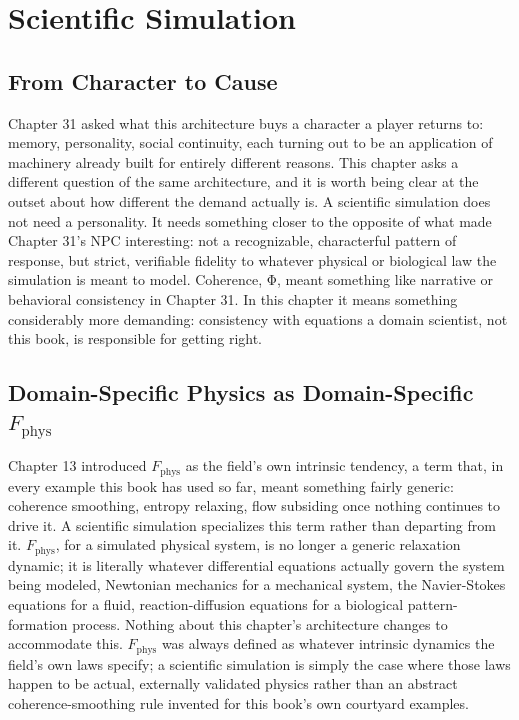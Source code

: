 \chapter{Scientific Simulation}

\section{From Character to Cause}

Chapter 31 asked what this architecture buys a character a player returns to: memory, personality, social continuity, each turning out to be an application of machinery already built for entirely different reasons. This chapter asks a different question of the same architecture, and it is worth being clear at the outset about how different the demand actually is. A scientific simulation does not need a personality. It needs something closer to the opposite of what made Chapter 31's NPC interesting: not a recognizable, characterful pattern of response, but strict, verifiable fidelity to whatever physical or biological law the simulation is meant to model. Coherence, Φ, meant something like narrative or behavioral consistency in Chapter 31. In this chapter it means something considerably more demanding: consistency with equations a domain scientist, not this book, is responsible for getting right.

\section{Domain-Specific Physics as Domain-Specific \(F_{\mathrm{phys}}\)}

Chapter 13 introduced \(F_{\mathrm{phys}}\) as the field's own intrinsic tendency, a term that, in every example this book has used so far, meant something fairly generic: coherence smoothing, entropy relaxing, flow subsiding once nothing continues to drive it. A scientific simulation specializes this term rather than departing from it. \(F_{\mathrm{phys}}\), for a simulated physical system, is no longer a generic relaxation dynamic; it is literally whatever differential equations actually govern the system being modeled, Newtonian mechanics for a mechanical system, the Navier-Stokes equations for a fluid, reaction-diffusion equations for a biological pattern-formation process. Nothing about this chapter's architecture changes to accommodate this. \(F_{\mathrm{phys}}\) was always defined as whatever intrinsic dynamics the field's own laws specify; a scientific simulation is simply the case where those laws happen to be actual, externally validated physics rather than an abstract coherence-smoothing rule invented for this book's own courtyard examples.

